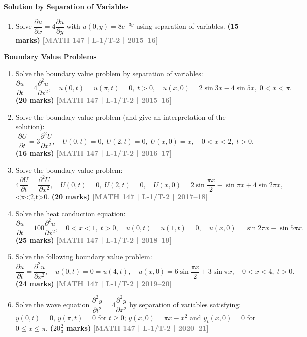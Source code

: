 \documentclass[12pt,a4paper]{article}
\newcommand{\yr}[1]{\hfill\textcolor{gray}{\small\textbf{[#1]}}}
\newcommand{\mk}[1]{\textcolor{orange!70!black}{\small\textbf{(#1 marks)}}}
\newcommand{\subtopic}[2]{%
  \vspace{10pt}
  \noindent\begin{tcolorbox}[colback=#1!8,colframe=#1,boxrule=0.6pt,arc=4pt,
    left=6pt,right=6pt,top=4pt,bottom=4pt]
    \small\bfseries\textcolor{#1}{#2}
  \end{tcolorbox}
  \vspace{2pt}
}
\begin{document}
\subtopic{cF}{Solution by Separation of Variables}
\label{sub:s6-separation}

\begin{enumerate}

\item Solve $\dfrac{\partial u}{\partial x}=4\dfrac{\partial u}{\partial y}$ with $u(0,y)=8e^{-3y}$ using separation of variables.
\mk{15} \yr{MATH 147 | L-1/T-2 | 2015--16}

\end{enumerate}

\subtopic{cF}{Boundary Value Problems}
\label{sub:s6-bvp}

\begin{enumerate}

\item Solve the boundary value problem by separation of variables:
\[
\frac{\partial u}{\partial t}=4\frac{\partial^{2}u}{\partial x^{2}},\quad u(0,t)=u(\pi,t)=0,\;t>0,\quad u(x,0)=2\sin 3x-4\sin 5x,\;0<x<\pi.
\]
\mk{20} \yr{MATH 147 | L-1/T-2 | 2015--16}

\item Solve the boundary value problem (and give an interpretation of the solution):
\[
\frac{\partial U}{\partial t}=3\frac{\partial^{2}U}{\partial x^{2}},\quad U(0,t)=0,\;U(2,t)=0,\;U(x,0)=x,\quad 0<x<2,\;t>0.
\]
\mk{16} \yr{MATH 147 | L-1/T-2 | 2016--17}

\item Solve the boundary value problem:
\[
4\frac{\partial U}{\partial t}=\frac{\partial^{2}U}{\partial x^{2}},\quad U(0,t)=0,\;U(2,t)=0,\quad U(x,0)=2\sin\frac{\pi x}{2}-\sin\pi x+4\sin 2\pi x,
\]
<x<2,\;t>0.
\mk{20} \yr{MATH 147 | L-1/T-2 | 2017--18}

\item Solve the heat conduction equation:
\[
\frac{\partial u}{\partial t}=100\frac{\partial^{2}u}{\partial x^{2}},\quad 0<x<1,\;t>0,\quad u(0,t)=u(1,t)=0,\quad u(x,0)=\sin 2\pi x-\sin 5\pi x.
\]
\mk{25} \yr{MATH 147 | L-1/T-2 | 2018--19}

\item Solve the following boundary value problem:
\[
\frac{\partial u}{\partial t}=\frac{\partial^{2}u}{\partial x^{2}},\quad u(0,t)=0=u(4,t),\quad u(x,0)=6\sin\frac{\pi x}{2}+3\sin\pi x,\quad 0<x<4,\;t>0.
\]
\mk{24} \yr{MATH 147 | L-1/T-2 | 2019--20}

\item Solve the wave equation $\dfrac{\partial^{2}y}{\partial t^{2}}=4\dfrac{\partial^{2}y}{\partial x^{2}}$ by separation of variables satisfying: $y(0,t)=0$, $y(\pi,t)=0$ for $t\ge 0$; $y(x,0)=\pi x-x^{2}$ and $y_{t}(x,0)=0$ for $0\le x\le\pi$.
\mk{$20\tfrac{2}{3}$} \yr{MATH 147 | L-1/T-2 | 2020--21}


\end{enumerate}
\end{document}
